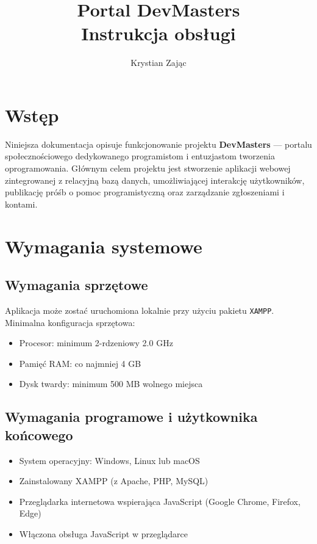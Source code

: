 \documentclass[a4paper,12pt]{article}
\title{Portal DevMasters \\ \large{Instrukcja obsługi}}
\author{Krystian Zając}
\date{}
\begin{document}
\maketitle
\tableofcontents
\newpage

\section{Wstęp}
Niniejsza dokumentacja opisuje funkcjonowanie projektu \textbf{DevMasters} — portalu społecznościowego dedykowanego programistom i entuzjastom tworzenia oprogramowania. Głównym celem projektu jest stworzenie aplikacji webowej zintegrowanej z relacyjną bazą danych, umożliwiającej interakcję użytkowników, publikację próśb o pomoc programistyczną oraz zarządzanie zgłoszeniami i kontami.

\section{Wymagania systemowe}

\subsection{Wymagania sprzętowe}
Aplikacja może zostać uruchomiona lokalnie przy użyciu pakietu \texttt{XAMPP}. Minimalna konfiguracja sprzętowa:
\begin{itemize}
    \item Procesor: minimum 2-rdzeniowy 2.0 GHz
    \item Pamięć RAM: co najmniej 4 GB
    \item Dysk twardy: minimum 500 MB wolnego miejsca
\end{itemize}

\subsection{Wymagania programowe i użytkownika końcowego}
\begin{itemize}
    \item System operacyjny: Windows, Linux lub macOS
    \item Zainstalowany XAMPP (z Apache, PHP, MySQL)
    \item Przeglądarka internetowa wspierająca JavaScript (Google Chrome, Firefox, Edge)
    \item Włączona obsługa JavaScript w przeglądarce
\end{itemize}
\end{document}
